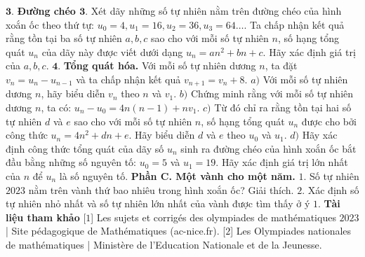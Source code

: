 \begin{multicols}{2}
	\vskip 0.05cm
	$\pmb{3.}$  \textbf{\color{cackithi}Đường chéo $\pmb{3.}$}
	\vskip 0.05cm 
	Xét dãy những số tự nhiên nằm trên đường chéo của hình xoắn ốc theo thứ tự: $u_0=4,u_1=16,u_2=36,u_3=64\ldots$. Ta chấp nhận kết quả rằng tồn tại ba số tự nhiên $a,b,c$ sao cho với mỗi số tự nhiên $n$, số hạng tổng quát $u_n$ của dãy này được viết dưới dạng $u_n=an^2+bn+c$. Hãy xác định giá trị của $a,b,c$.
	\vskip 0.05cm 
	$\pmb{4.}$  \textbf{\color{cackithi}Tổng quát hóa.}
	\vskip 0.05cm 
	Với mỗi số tự nhiên dương $n$, ta đặt $v_n=u_n-u_{n-1}$ và ta chấp nhận kết quả $v_{n+1}=v_n+8$.
	\vskip 0.05cm 
	$a)$ Với mỗi số tự nhiên dương $n$, hãy biểu diễn $v_n$ theo $n$ và $v_1$.
	\vskip 0.05cm
	$b)$ Chứng minh rằng với mỗi số tự nhiên dương $n$, ta có: $u_n-u_0=4n(n-1)+nv_1$.
	\vskip 0.05cm
	$c)$ Từ đó chỉ ra rằng tồn tại hai số tự nhiên $d$ và $e$ sao cho với mỗi số tự nhiên $n$, số hạng tổng quát $u_n$ được cho bởi công thức $u_n=4n^2+dn+e$. Hãy biểu diễn $d$ và $e$ theo $u_0$ và $u_1$.
	\vskip 0.05cm 
	$d)$ Hãy xác định công thức tổng quát của dãy số $u_n$ sinh ra đường chéo của hình xoắn ốc bắt đầu bằng những số nguyên tố: $u_0=5$ và $u_1=19$. Hãy xác định giá trị lớn nhất của $n$ để $u_n$ là số nguyên tố. 
	\vskip 0.05cm
	 \textbf{\color{cackithi}Phần C.  Một vành cho một năm.}
	\vskip 0.05cm
	$1.$ Số tự nhiên $2023$ nằm trên vành thứ bao nhiêu trong hình xoắn ốc? Giải thích. 
	\vskip 0.05cm
	$2.$ Xác định số tự nhiên nhỏ nhất và số tự nhiên lớn nhất của vành được tìm thấy ở ý $1$.
	\vskip 0.05cm 
	 \textbf{\color{cackithi}Tài liệu tham khảo}
	\vskip 0.05cm 
	[$1$] Les sujets et corrigés des olympiades de mathématiques $2023$ | Site pédagogique de Mathématiques (ac-nice.fr).
	\vskip 0.05cm
	[$2$] Les Olympiades nationales de mathématiques | Ministère de l'Education Nationale et de la Jeunesse. 
\end{multicols}
\newpage
\begingroup
